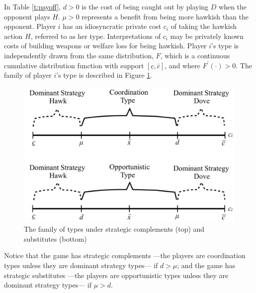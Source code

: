 \documentclass[12pt,english]{article}
\begin{document}
In Table \ref{t:payoff}, $d>0$ is the cost of being caught out by playing $D$ when the opponent plays $H$. $\mu>0$ represents a benefit from being more hawkish than the opponent. Player $i$ has an idiosyncratic private cost $c_i$ of taking the hawkish action $H$, referred to as her type. Interpretations of $c_i$ may be privately known costs of building weapons or welfare loss for being hawkish. Player $i$'s type is independently drawn from the same distribution, $F$, which is a continuous cumulative distribution function with support $[\underline{c}, \bar{c}]$, and where $F^{\prime}(\cdot)>0$. The family of player $i$'s type is described in Figure \ref{fig:1}.\par
\begin{figure}[h]
\centering
	\includegraphics[scale=0.24]{figure1.jpg}
	\caption{The family of types under strategic complements (top) and substitutes (bottom)}
	\label{fig:1}
\end{figure}
Notice that the game has strategic complements ---the players are coordination types unless they are dominant strategy types--- if $d>\mu$; and the game has strategic substitutes ---the players are opportunistic types unless they are dominant strategy types--- if $\mu> d$. \par
\end{document}
